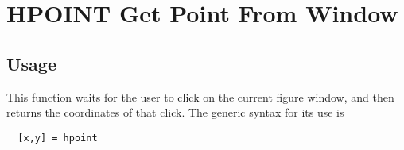 \section{HPOINT Get Point From Window}

\subsection{Usage}

This function waits for the user to click on the current figure
window, and then returns the coordinates of that click.  The
generic syntax for its use is
\begin{verbatim}
  [x,y] = hpoint
\end{verbatim}
